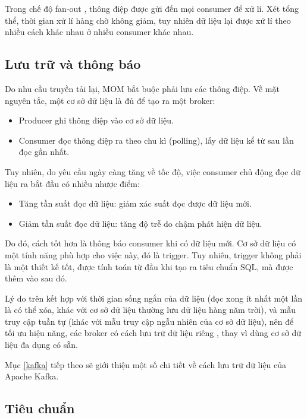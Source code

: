 \documentclass{article}
\begin{document}
Trong chế độ fan-out \cite{waitingforcode2019}, thông điệp được gửi đến mọi
consumer để xử lí. Xét tổng thể, thời gian xử lí hàng chờ không giảm, tuy nhiên
dữ liệu lại được xử lí theo nhiều cách khác nhau ở nhiều consumer khác nhau.

\subsection{Lưu trữ và thông báo}

Do nhu cầu truyền tải lại, MOM bắt buộc phải lưu các thông điệp. Về mặt nguyên
tắc, một cơ sở dữ liệu là đủ để tạo ra một broker:

\begin{itemize}
    \item Producer ghi thông điệp vào cơ sở dữ liệu.
    \item Consumer đọc thông điệp ra theo chu kì (polling), lấy dữ liệu kể từ
        sau lần đọc gần nhất.
\end{itemize}

Tuy nhiên, do yêu cầu ngày càng tăng về tốc độ, việc consumer chủ động đọc dữ
liệu ra bắt đầu có nhiều nhược điểm:

\begin{itemize}
    \item Tăng tần suất đọc dữ liệu: giảm xác suất đọc được dữ liệu mới.
    \item Giảm tần suất đọc dữ liệu: tăng độ trễ do chậm phát hiện dữ liệu.
\end{itemize}

Do đó, cách tốt hơn là thông báo consumer khi có dữ liệu mới. Cơ sở dữ liệu có
một tính năng phù hợp cho việc này, đó là trigger. Tuy nhiên, trigger không phải
là một thiết kế tốt, được tính toán từ đầu khi tạo ra tiêu chuẩn SQL, mà được
thêm vào sau đó.

Lý do trên kết hợp với thời gian sống ngắn của dữ liệu (đọc xong ít nhất một lần
là có thể xóa, khác với cơ sở dữ liệu thường lưu dữ liệu hàng năm trời), và mẫu
truy cập tuần tự (khác với mẫu truy cập ngẫu nhiên của cơ sở dữ liệu), nên để
tối ưu hiệu năng, các broker có cách lưu trữ dữ liệu riêng
\cite{monitor_stream}, thay vì dùng cơ sở dữ liệu đa dụng có sẵn.

Mục \ref{kafka} tiếp theo sẽ giới thiệu một số chi tiết về cách lưu trữ dữ liệu
của Apache Kafka.

\subsection{Tiêu chuẩn}
\end{document}
